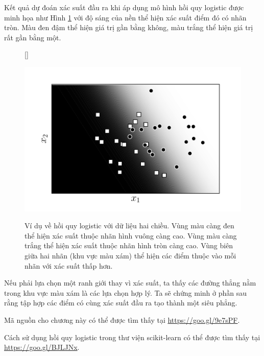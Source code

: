 Kết quả dự đoán xác suất đầu ra khi áp dụng mô hình hồi quy logistic được minh họa như Hình
\ref{fig:10_7} với độ sáng của nền thể hiện xác suất điểm đó có nhãn tròn. Màu đen
đậm thể hiện giá trị gần bằng không, màu trắng thể hiện giá trị rất gần bằng một.

\begin{figure}[t]
    [\FBwidth]
    {\caption{ 
    Ví dụ về hồi quy logistic với dữ liệu hai chiều. Vùng màu càng đen thể hiện xác suất thuộc nhãn hình vuông càng cao. Vùng màu càng trắng thể hiện xác suất thuộc nhãn hình tròn càng cao. Vùng biên giữa hai nhãn (khu vực màu xám) thể hiện các điểm thuộc vào mỗi nhãn với xác suất thấp hơn.    }
    \label{fig:10_7}}
    { %
    \includegraphics[width=.5\textwidth]{ebookML_src/src/logistic_regression/logistic_2d_2.pdf}
    }
\end{figure}

Nếu phải lựa chọn một ranh giới thay vì xác suất, ta thấy các đường thẳng nằm
trong khu vực màu xám là các lựa chọn hợp lý. Ta sẽ chứng minh ở phần sau rằng
tập hợp các điểm có cùng xác suất đầu ra tạo thành một siêu phẳng.

Mã nguồn cho chương này có thể được tìm thấy tại
    \url{https://goo.gl/9e7sPF}. 

Cách sử dụng hồi quy logistic trong thư viện scikit-learn có thể được tìm thấy tại \url{https://goo.gl/BJLJNx}.

 
